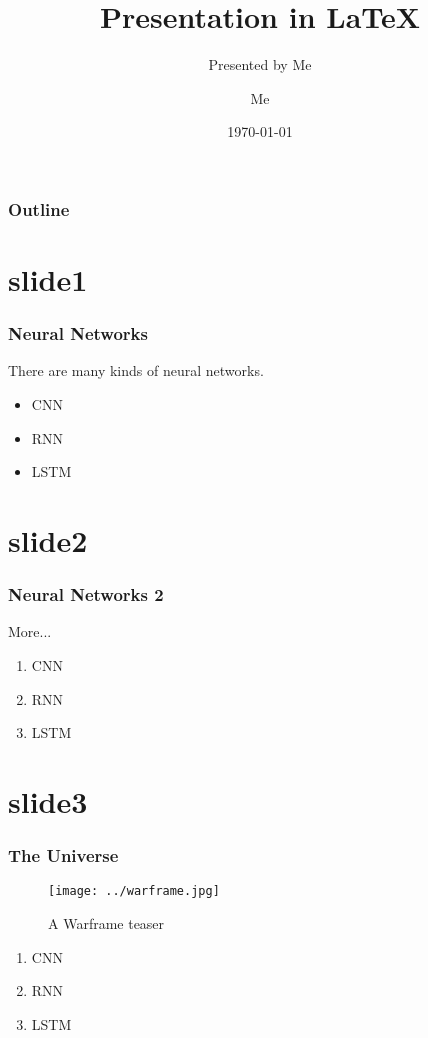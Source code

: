 \documentclass[xcolor=dvipsnames]{beamer}
\title[pre]{Presentation in \LaTeX}
\subtitle[pre by me]{Presented by Me}
\author[me]{Me}
\date[2018]{\today}
\institute[Univ]{My University}
\begin{document}
\begin{frame}[t]
    \titlepage
\end{frame}

\begin{frame}[t]
    \frametitle{Outline}
    \tableofcontents
\end{frame}

\section{slide1}
\begin{frame}[t]
    \frametitle{Neural Networks}
    There are many kinds of neural networks.
    \begin{itemize}
        \item CNN
        \item RNN
        \item LSTM
    \end{itemize}
\end{frame}

\section{slide2}
\begin{frame}[t]
    \frametitle{Neural Networks 2}
    More...
    \begin{enumerate}
        \item CNN
        \item RNN
        \item LSTM
    \end{enumerate}
\end{frame}

\section{slide3}
\begin{frame}[t]
    \frametitle{The Universe}
    \begin{figure}[h!]
        \centering
        \texttt{[image: ../warframe.jpg]}
        \caption{A Warframe teaser}
        \label{universe}
        \pause
    \end{figure}
    \begin{enumerate}
        \item CNN
        \item RNN
        \item LSTM
    \end{enumerate}
\end{frame}
\end{document}

